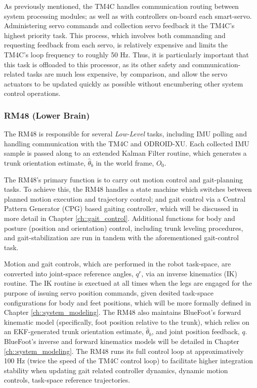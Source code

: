 			As previously mentioned, the TM4C handles communication routing between system processing modules; as well as with controllers on-board each smart-servo. Administering servo commands and collection servo feedback it the TM4C's highest priority task. This process, which involves both commanding and requesting feedback from each servo, is relatively expensive  and limits the TM4C's loop frequency to roughly 50 Hz. Thus, it is particularly important that this task is offloaded to this processor, as its other safety and communication-related tasks are much less expensive, by comparison, and allow the servo actuators to be updated quickly as possible without encumbering other system control operations.


			\subsubsection{RM48 (Lower Brain)}

			The RM48 is responsible for several \emph{Low-Level} tasks, including IMU polling and handling communication with the TM4C and ODROID-XU. Each collected IMU sample is passed along to an extended Kalman Filter routine, which generates a trunk orientation estimate, $\hat{\theta}_{b}$ in the world frame, $O_{0}$. 

			The RM48's primary function is to carry out motion control and gait-planning tasks. To achieve this, the RM48 handles a state machine which switches between planned motion execution and trajectory control; and gait control via a Central Pattern Generator (CPG) based gaiting controller, which will be discussed in more detail in Chapter \ref{ch::gait_control}. Additional functions for body and posture (position and orientation) control, including trunk leveling procedures, and gait-stabilization are run in tandem with the aforementioned gait-control task.

			Motion and gait controls, which are performed in the robot task-space, are converted into joint-space reference angles, $q^{r}$, via an inverse kinematics (IK) routine. The IK routine is exectued at all times when the legs are engaged for the purpose of issuing servo position commands, given desited task-space configurations for body and feet positions, which will be more formally defined in Chapter \ref{ch::system_modeling}. The RM48 also maintains BlueFoot's forward kinematic model (specifically, foot position relative to the trunk), which relies on an EKF-generated trunk orientation estimate, $\hat{\theta}_{b}$, and joint position feedback, $q$. BlueFoot's inverse and forward kinematics models will be detailed in Chapter \ref{ch::system_modeling}. The RM48 runs its full control loop at approximatively 100 Hz (twice the speed of the TM4C control loop) to facilitate higher integration stability when updating gait related controller dynamics, dynamic motion controls, task-space reference trajectories.

